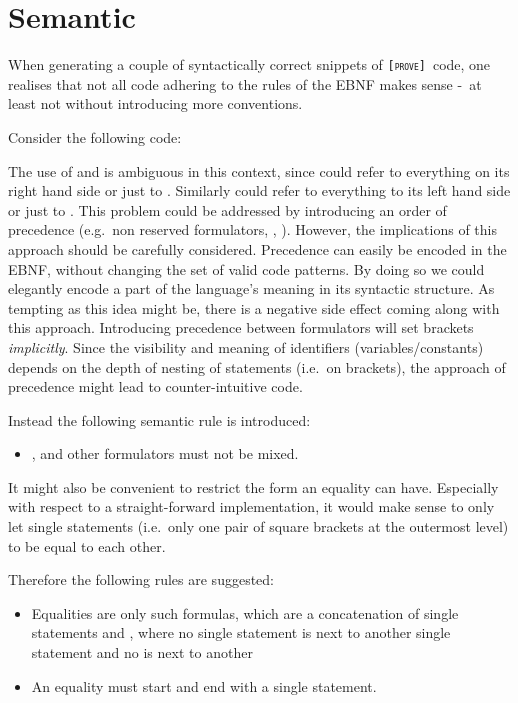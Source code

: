 \documentclass[british]{article}
\newenvironment{code}{\captionsetup{type=listing, skip=0pt}}{}
\newcommand\m[1]{\pcode{\texttt{#1}}}
\newcommand\name{\texttt{\textsc{[prove]}}}
\newcommand\sourcecode[1]{%
	\begin{code}
		\begin{tcolorbox}[breakable, left=7mm, colbacktitle=manatee,%
			title=\captionof{listing}{\texttt{examples/#1.prove}}\label{code:#1}]
			\VerbatimInput[obeytabs, numbers=left]{examples/#1.prove}%
	\end{tcolorbox}%
	\end{code}
}
\begin{document}
\pagebreak{}

\section{Semantic}

When generating a couple of syntactically correct snippets of \name\ code, one
realises that not all code adhering to the rules of the EBNF makes sense -\ at
least not without introducing more conventions.

\medskip{}

Consider the following code:
\newline

\sourcecode{invalid}

The use of \m{=} and \m{=>} is ambiguous in this context, since \m{=} could
refer to everything on its right hand side or just to \m{[c]}. Similarly \m{=>}
could refer to everything to its left hand side or just to \m{[c]}. This problem
could be addressed by introducing an order of precedence (e.g.\ non reserved
formulators, \m{=}, \m{=>}). However, the implications of this approach should
be carefully considered. Precedence can easily be encoded in the EBNF, without
changing the set of valid code patterns. By doing so we could elegantly encode a
part of the language's meaning in its syntactic structure. As tempting as this
idea might be, there is a negative side effect coming along with this approach.
Introducing precedence between formulators will set brackets \emph{implicitly}.
Since the visibility and meaning of identifiers (variables/constants) depends on
the depth of nesting of statements (i.e.\ on brackets), the approach of
precedence might lead to counter-intuitive code.\newline 

Instead the following semantic rule is introduced:
\begin{itemize}
	\item \m{=}, \m{=>} and other formulators must not be mixed.%
\end{itemize}

\medskip{}

It might also be convenient to restrict the form an equality can have.
Especially with respect to a straight-forward implementation, it would
make sense to only let single statements (i.e.\ only one pair of square
brackets at the outermost level) to be equal to each other.\newline

Therefore the following rules are suggested:
\begin{itemize}
	\item
		Equalities are only such formulas, which are a concatenation of single
		statements and \m{=}, where no single statement is next to another
		single statement and no \m{=} is next to another \m{=}%
	\item
		An equality must start and end with a single statement.%
\end{itemize}
\medskip{}
\end{document}
